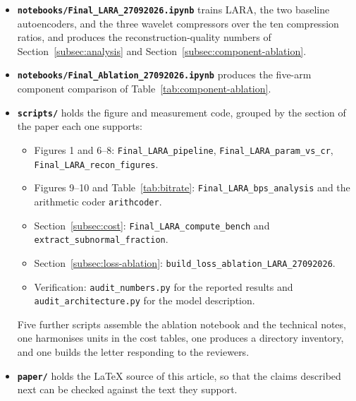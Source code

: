 \documentclass[fleqn,10pt]{wlscirep}
\begin{document}
\begin{itemize}
    \item \textbf{\texttt{notebooks/Final\_LARA\_27092026.ipynb}} trains LARA, the two baseline autoencoders, and the three wavelet compressors over the ten compression ratios, and produces the reconstruction-quality numbers of Section~\ref{subsec:analysis} and Section~\ref{subsec:component-ablation}.
    \item \textbf{\texttt{notebooks/Final\_Ablation\_27092026.ipynb}} produces the five-arm component comparison of Table~\ref{tab:component-ablation}.
    \item \textbf{\texttt{scripts/}} holds the figure and measurement code, grouped by the section of the paper each one supports:
      \begin{itemize}\raggedright
        \item Figures 1 and 6--8: \texttt{Final\_LARA\_pipeline}, \texttt{Final\_LARA\_param\_vs\_cr}, \texttt{Final\_LARA\_\allowbreak{}recon\_\allowbreak{}figures}.
        \item Figures 9--10 and Table~\ref{tab:bitrate}: \texttt{Final\_LARA\_bps\_analysis} and the arithmetic coder \texttt{arithcoder}.
        \item Section~\ref{subsec:cost}: \texttt{Final\_LARA\_compute\_bench} and \texttt{extract\_subnormal\_fraction}.
        \item Section~\ref{subsec:loss-ablation}: \texttt{build\_loss\_ablation\_LARA\_27092026}.
        \item Verification: \texttt{audit\_numbers.py} for the reported results and \texttt{audit\_architecture.py} for the model description.
      \end{itemize}
      Five further scripts assemble the ablation notebook and the technical notes, one harmonises units in the cost tables, one produces a directory inventory, and one builds the letter responding to the reviewers.
    \item \textbf{\texttt{paper/}} holds the \LaTeX{} source of this article, so that the claims described next can be checked against the text they support.
\end{itemize}
\end{document}
